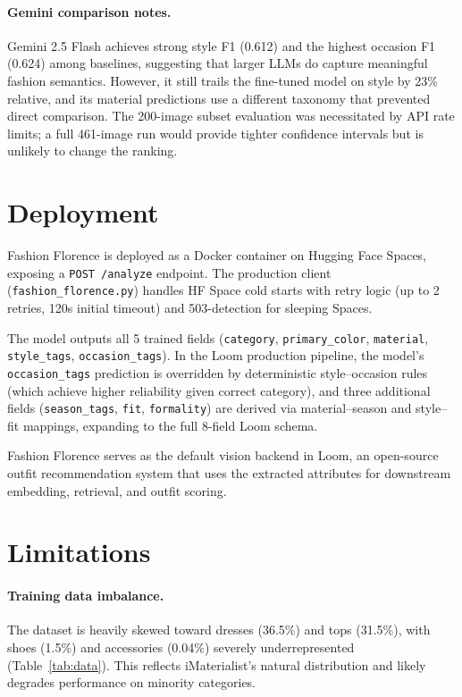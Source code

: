\documentclass[10pt,twocolumn]{article}
\begin{document}
\paragraph{Gemini comparison notes.}
Gemini 2.5 Flash achieves strong style F1 (0.612) and the highest occasion
F1 (0.624) among baselines, suggesting that larger LLMs do capture
meaningful fashion semantics.  However, it still trails the fine-tuned model
on style by 23\% relative, and its material predictions use a different
taxonomy that prevented direct comparison.  The 200-image subset evaluation
was necessitated by API rate limits; a full 461-image run would provide
tighter confidence intervals but is unlikely to change the ranking.

\section{Deployment}
\label{sec:deployment}

Fashion Florence is deployed as a Docker container on Hugging Face Spaces,
exposing a \texttt{POST /analyze} endpoint.  The production client
(\texttt{fashion\_florence.py}) handles HF Space cold starts with retry logic
(up to 2 retries, 120s initial timeout) and 503-detection for sleeping
Spaces.

The model outputs all 5 trained fields (\texttt{category},
\texttt{primary\_color}, \texttt{material}, \texttt{style\_tags},
\texttt{occasion\_tags}).  In the Loom production pipeline, the model's
\texttt{occasion\_tags} prediction is overridden by deterministic
style--occasion rules (which achieve higher reliability given correct
category), and three additional fields (\texttt{season\_tags},
\texttt{fit}, \texttt{formality}) are derived via material--season and
style--fit mappings, expanding to the full 8-field Loom schema.

Fashion Florence serves as the default vision backend in Loom, an
open-source outfit recommendation system that uses the extracted attributes
for downstream embedding, retrieval, and outfit scoring.

\section{Limitations}
\label{sec:limitations}

\paragraph{Training data imbalance.}
The dataset is heavily skewed toward dresses (36.5\%) and tops (31.5\%),
with shoes (1.5\%) and accessories (0.04\%) severely underrepresented
(Table~\ref{tab:data}).  This reflects iMaterialist's natural distribution
and likely degrades performance on minority categories.
\end{document}
